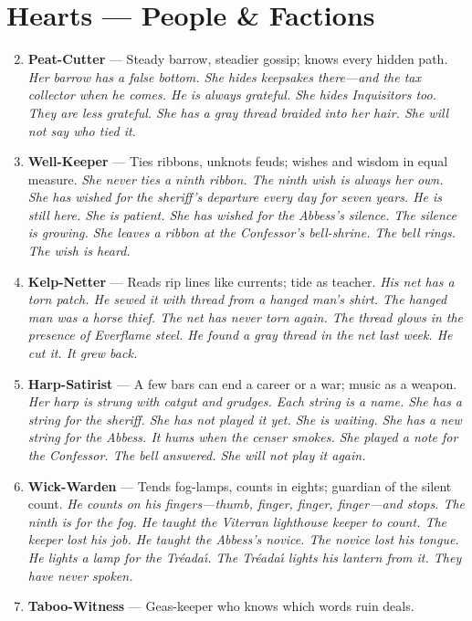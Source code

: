 \section*{Hearts --- People \& Factions}
\label{sec:theona-people}
\begin{enumerate}
\setcounter{enumi}{1}
\item \textbf{Peat-Cutter} --- Steady barrow, steadier gossip; knows every hidden path.
  \hfill \textit{Her barrow has a false bottom. She hides keepsakes there---and the tax collector when he comes. He is always grateful. She hides Inquisitors too. They are less grateful. She has a gray thread braided into her hair. She will not say who tied it.}
\item \textbf{Well-Keeper} --- Ties ribbons, unknots feuds; wishes and wisdom in equal measure.
  \hfill \textit{She never ties a ninth ribbon. The ninth wish is always her own. She has wished for the sheriff's departure every day for seven years. He is still here. She is patient. She has wished for the Abbess's silence. The silence is growing. She leaves a ribbon at the Confessor's bell-shrine. The bell rings. The wish is heard.}
\item \textbf{Kelp-Netter} --- Reads rip lines like currents; tide as teacher.
  \hfill \textit{His net has a torn patch. He sewed it with thread from a hanged man's shirt. The hanged man was a horse thief. The net has never torn again. The thread glows in the presence of Everflame steel. He found a gray thread in the net last week. He cut it. It grew back.}
\item \textbf{Harp-Satirist} --- A few bars can end a career or a war; music as a weapon.
  \hfill \textit{Her harp is strung with catgut and grudges. Each string is a name. She has a string for the sheriff. She has not played it yet. She is waiting. She has a new string for the Abbess. It hums when the censer smokes. She played a note for the Confessor. The bell answered. She will not play it again.}
\item \textbf{Wick-Warden} --- Tends fog-lamps, counts in eights; guardian of the silent count.
  \hfill \textit{He counts on his fingers---thumb, finger, finger, finger---and stops. The ninth is for the fog. He taught the Viterran lighthouse keeper to count. The keeper lost his job. He taught the Abbess's novice. The novice lost his tongue. He lights a lamp for the Tr\'eada\'{\i}. The Tr\'eada\'{\i} lights his lantern from it. They have never spoken.}
\item \textbf{Taboo-Witness} --- Geas-keeper who knows which words ruin deals.

\end{enumerate}

